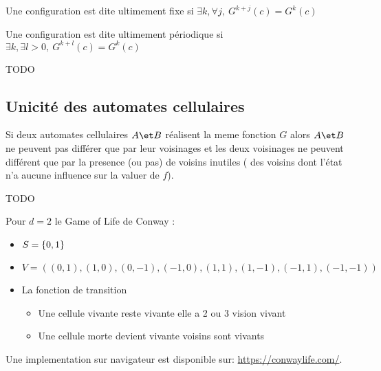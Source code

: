 \begin{definition}
	Une configuration est dite ultimement fixe si $\exists k, \forall j, \ G^{k+j}(c) =  G^{k}(c)$
\end{definition}


\begin{definition}
	Une configuration est dite ultimement périodique si $\exists k, \exists l>0, \ G^{k+l}(c) =  G^{k}(c)$
\end{definition}


\begin{exemple}
	TODO
\end{exemple}


\subsection{Unicité des automates cellulaires}


\begin{theorem}
	Si deux automates cellulaires $A \et B$ réalisent la meme fonction $G$ alors $A \et B$ ne peuvent pas différer que par
	leur voisinages et les deux voisinages ne peuvent différent que par la presence (ou pas) de voisins inutiles (\cad
	des voisins dont l'état n'a aucune influence sur la valuer de $f$).
\end{theorem}


\begin{exemple}
	TODO
\end{exemple}


\begin{exemple}
	Pour $d = 2$ le Game of Life de Conway \cite{conwayGOL}:
	\begin{itemize}
		\item $S = \left\{0,1\right\}$
		\item $V = ((0,1), (1,0), (0,-1), (-1,0), (1,1), (1,-1), (-1,1), (-1,-1))$
		\item La fonction de transition
		      \begin{itemize}
			      \item Une cellule vivante reste vivante \ssi elle a 2 ou 3 vision vivant
			      \item Une cellule morte devient vivante  voisins sont vivants
		      \end{itemize}
	\end{itemize}


	Une implementation sur navigateur est disponible sur: \url{https://conwaylife.com/}.
\end{exemple}

